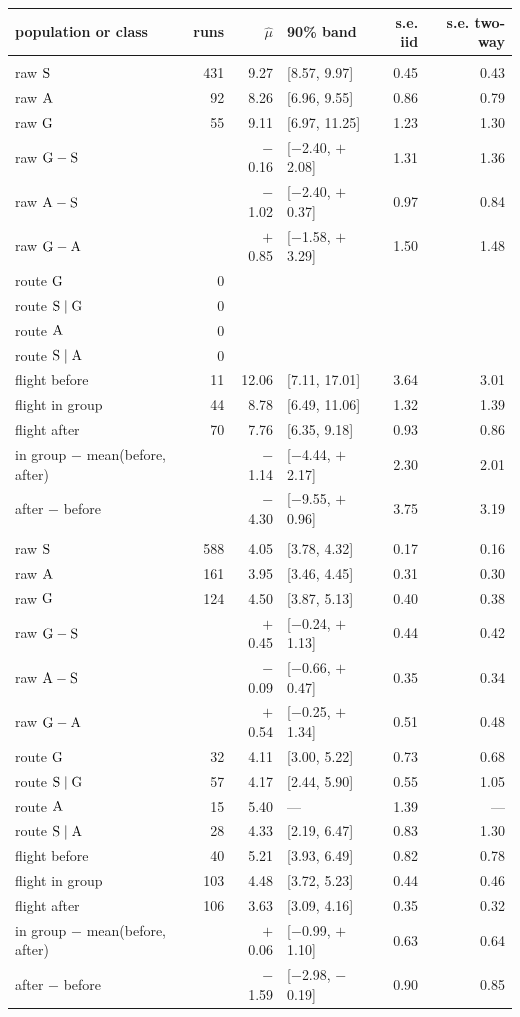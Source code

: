 \begin{tabular}{@{}l r r l r r@{}}
\toprule
population or class & runs & $\hat\mu$ & 90\% band & s.e. iid & s.e. two-way \\
\midrule
\addlinespace[2pt]\multicolumn{1}{@{}l}{\emph{climbs}}\\
raw $\mathrm{S}$ & 431 & 9.27 & [8.57, 9.97] & 0.45 & 0.43 \\
raw $\mathrm{A}$ & 92 & 8.26 & [6.96, 9.55] & 0.86 & 0.79 \\
raw $\mathrm{G}$ & 55 & 9.11 & [6.97, 11.25] & 1.23 & 1.30 \\
raw $\mathrm{G}-\mathrm{S}$ &  & $-$0.16 & [$-$2.40, $+$2.08] & 1.31 & 1.36 \\
raw $\mathrm{A}-\mathrm{S}$ &  & $-$1.02 & [$-$2.40, $+$0.37] & 0.97 & 0.84 \\
raw $\mathrm{G}-\mathrm{A}$ &  & $+$0.85 & [$-$1.58, $+$3.29] & 1.50 & 1.48 \\
route $\mathrm{G}$ & 0 &  &  &  &  \\
route $\mathrm{S}\mid\mathrm{G}$ & 0 &  &  &  &  \\
route $\mathrm{A}$ & 0 &  &  &  &  \\
route $\mathrm{S}\mid\mathrm{A}$ & 0 &  &  &  &  \\
flight before & 11 & 12.06 & [7.11, 17.01] & 3.64 & 3.01 \\
flight in group & 44 & 8.78 & [6.49, 11.06] & 1.32 & 1.39 \\
flight after & 70 & 7.76 & [6.35, 9.18] & 0.93 & 0.86 \\
in group $-$ mean(before, after) &  & $-$1.14 & [$-$4.44, $+$2.17] & 2.30 & 2.01 \\
after $-$ before &  & $-$4.30 & [$-$9.55, $+$0.96] & 3.75 & 3.19 \\
\addlinespace[2pt]\multicolumn{1}{@{}l}{\emph{searches ending in a climb}}\\
raw $\mathrm{S}$ & 588 & 4.05 & [3.78, 4.32] & 0.17 & 0.16 \\
raw $\mathrm{A}$ & 161 & 3.95 & [3.46, 4.45] & 0.31 & 0.30 \\
raw $\mathrm{G}$ & 124 & 4.50 & [3.87, 5.13] & 0.40 & 0.38 \\
raw $\mathrm{G}-\mathrm{S}$ &  & $+$0.45 & [$-$0.24, $+$1.13] & 0.44 & 0.42 \\
raw $\mathrm{A}-\mathrm{S}$ &  & $-$0.09 & [$-$0.66, $+$0.47] & 0.35 & 0.34 \\
raw $\mathrm{G}-\mathrm{A}$ &  & $+$0.54 & [$-$0.25, $+$1.34] & 0.51 & 0.48 \\
route $\mathrm{G}$ & 32 & 4.11 & [3.00, 5.22] & 0.73 & 0.68 \\
route $\mathrm{S}\mid\mathrm{G}$ & 57 & 4.17 & [2.44, 5.90] & 0.55 & 1.05 \\
route $\mathrm{A}$ & 15 & 5.40 & --- & 1.39 & --- \\
route $\mathrm{S}\mid\mathrm{A}$ & 28 & 4.33 & [2.19, 6.47] & 0.83 & 1.30 \\
flight before & 40 & 5.21 & [3.93, 6.49] & 0.82 & 0.78 \\
flight in group & 103 & 4.48 & [3.72, 5.23] & 0.44 & 0.46 \\
flight after & 106 & 3.63 & [3.09, 4.16] & 0.35 & 0.32 \\
in group $-$ mean(before, after) &  & $+$0.06 & [$-$0.99, $+$1.10] & 0.63 & 0.64 \\
after $-$ before &  & $-$1.59 & [$-$2.98, $-$0.19] & 0.90 & 0.85 \\
\bottomrule
\end{tabular}
